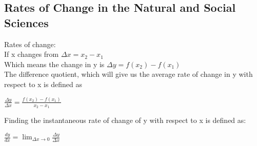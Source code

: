 \documentclass[10pt,a4paper]{article}
\begin{document}
	\subsection{Rates of Change in the Natural and Social Sciences}
	Rates of change: 
	\\If x changes from $\Delta{x} = x_{2}-x_{1}$
	\\Which means the change in y is $\Delta{y} = f(x_{2})-f(x_{1})$
	\\The difference quotient, which will give us the average rate of change in y with respect to x is defined as
	\begin{center} 
		$\frac{\Delta{y}}{\Delta{x}}= \frac{f(x_{2})-f(x_{1})}{x_{2}-x_{1}}$
	\end{center}
	Finding the instantaneous rate of change of y with respect to x is defined as:
	\begin{center}
		$\frac{dy}{dx}= \lim_{\Delta{x}\rightarrow 0}{\frac{\Delta{y}}{\Delta{x}}}$
	\end{center}
\end{document}
